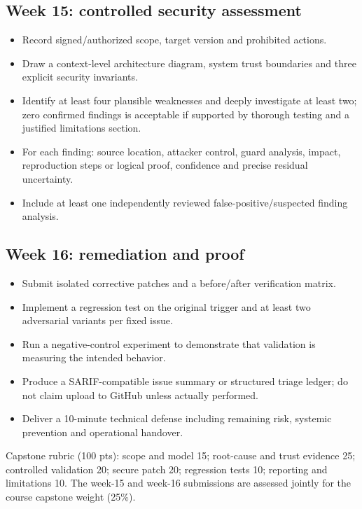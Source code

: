 \documentclass[10pt,letterpaper]{article}
\begin{document}
\subsection{Week 15: controlled security assessment}
\begin{itemize}[leftmargin=*,itemsep=2pt]
\item Record signed/authorized scope, target version and prohibited actions.
\item Draw a context-level architecture diagram, system trust boundaries and three explicit security invariants.
\item Identify at least four plausible weaknesses and deeply investigate at least two; zero confirmed findings is acceptable if supported by thorough testing and a justified limitations section.
\item For each finding: source location, attacker control, guard analysis, impact, reproduction steps or logical proof, confidence and precise residual uncertainty.
\item Include at least one independently reviewed false-positive/suspected finding analysis.
\end{itemize}
\subsection{Week 16: remediation and proof}
\begin{itemize}[leftmargin=*,itemsep=2pt]
\item Submit isolated corrective patches and a before/after verification matrix.
\item Implement a regression test on the original trigger and at least two adversarial variants per fixed issue.
\item Run a negative-control experiment to demonstrate that validation is measuring the intended behavior.
\item Produce a SARIF-compatible issue summary or structured triage ledger; do not claim upload to GitHub unless actually performed.
\item Deliver a 10-minute technical defense including remaining risk, systemic prevention and operational handover.
\end{itemize}
Capstone rubric (100 pts): scope and model 15; root-cause and trust evidence 25; controlled validation 20; secure patch 20; regression tests 10; reporting and limitations 10. The week-15 and week-16 submissions are assessed jointly for the course capstone weight (25\%).
\end{document}
